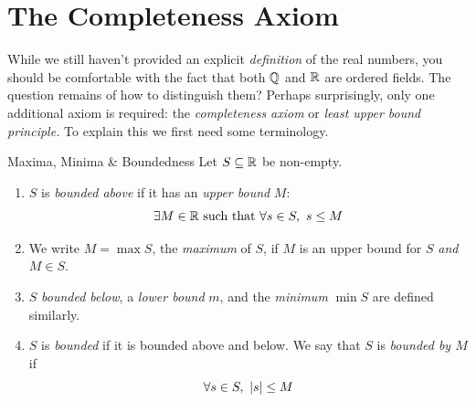 \clearpage



\section[The Completeness Axiom]{The Completeness Axiom}

While we still haven't provided an explicit \emph{definition} of the real numbers, you should be comfortable with the fact that both $\mathbb{Q}$ and $\mathbb{R}$ are ordered fields. The question remains of how to distinguish them? Perhaps surprisingly, only one additional axiom is required: the \emph{completeness axiom} or \emph{least upper bound principle.} To explain this we first need some terminology.

\begin{defn}{Maxima, Minima \& Boundedness}{}
	Let $S\subseteq\mathbb{R}$ be non-empty.
	\begin{enumerate}
		\item $S$ is \emph{bounded above} if it has an \emph{upper bound} $M$:
		\[\exists M\in\mathbb{R}\text{ such that }\forall s\in S,
		\ s\le M\]
		\item We write $M=\max S$, the \emph{maximum} of $S$, if $M$ is an upper bound for $S$ \emph{and} $M\in S$.
		\item $S$ \emph{bounded below}, a \emph{lower bound} $m$, and the \emph{minimum} $\min S$ are defined similarly.
		\item $S$ is \emph{bounded} if it is bounded above and below. We say that $S$ is \emph{bounded by $M$} if
		\[\forall s\in S,\ \left| s\right|\le M\]
	\end{enumerate}
\end{defn}

